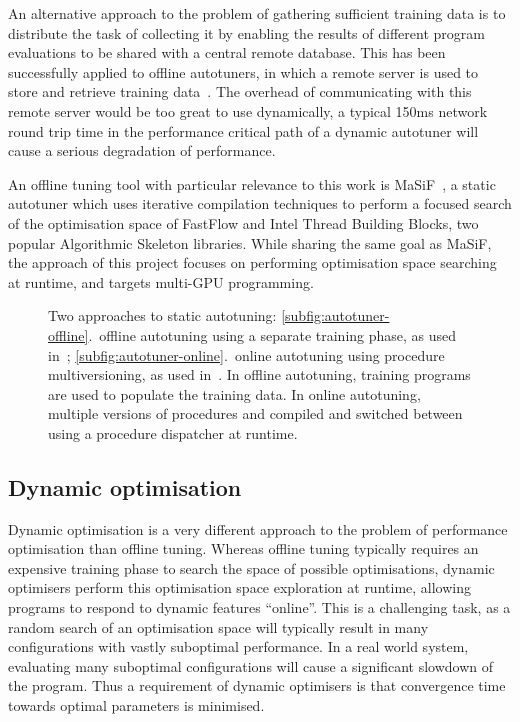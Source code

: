 An alternative approach to the problem of gathering sufficient
training data is to distribute the task of collecting it by enabling
the results of different program evaluations to be shared with a
central remote database. This has been successfully applied to offline
autotuners, in which a remote server is used to store and retrieve
training data~\cite{Fursin2014, Auler2014}. The overhead of
communicating with this remote server would be too great to use
dynamically, a typical 150ms network round trip time in the
performance critical path of a dynamic autotuner will cause a serious
degradation of performance.

An offline tuning tool with particular relevance to this work is
MaSiF~\cite{Collins2013}, a static autotuner which uses iterative
compilation techniques to perform a focused search of the optimisation
space of FastFlow and Intel Thread Building Blocks, two popular
Algorithmic Skeleton libraries. While sharing the same goal as MaSiF,
the approach of this project focuses on performing optimisation space
searching at runtime, and targets multi-GPU programming.

\begin{figure}[t]

\caption{Two approaches to static autotuning:
  \ref{subfig:autotuner-offline}.\ offline autotuning using a separate
  training phase, as used in~\cite{Agakov, Fursin2011, Collins2013};
  \ref{subfig:autotuner-online}.\ online autotuning using procedure
  multiversioning, as used in~\cite{Fursin2005}. In offline
  autotuning, training programs are used to populate the training
  data. In online autotuning, multiple versions of procedures and
  compiled and switched between using a procedure dispatcher at
  runtime.}
\label{fig:autotuners}
\end{figure}

\subsection{Dynamic optimisation}\label{subsec:dynamic-optimisation}
Dynamic optimisation is a very different approach to the problem of
performance optimisation than offline tuning. Whereas offline tuning
typically requires an expensive training phase to search the space of
possible optimisations, dynamic optimisers perform this optimisation
space exploration at runtime, allowing programs to respond to dynamic
features ``online''. This is a challenging task, as a random search of
an optimisation space will typically result in many configurations
with vastly suboptimal performance. In a real world system, evaluating
many suboptimal configurations will cause a significant slowdown of
the program. Thus a requirement of dynamic optimisers is that
convergence time towards optimal parameters is minimised.

